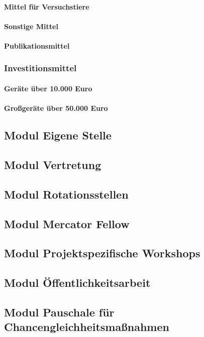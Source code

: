 \documentclass[de]{dfg-proposal}
\begin{document}
                \paragraph{Mittel für Versuchstiere}

                \paragraph{Sonstige Mittel}

                \paragraph{Publikationsmittel}

            \subsubsection{Investitionsmittel}

                \paragraph{Geräte über 10.000 Euro}

                \paragraph{Großgeräte über 50.000 Euro}

        \subsection{Modul Eigene Stelle}

        \subsection{Modul Vertretung}

        \subsection{Modul Rotationsstellen}

        \subsection{Modul Mercator Fellow}

        \subsection{Modul Projektspezifische Workshops}

        \subsection{Modul Öffentlichkeitsarbeit}

        \subsection{Modul Pauschale für Chancengleichheitsmaßnahmen}
\end{document}
